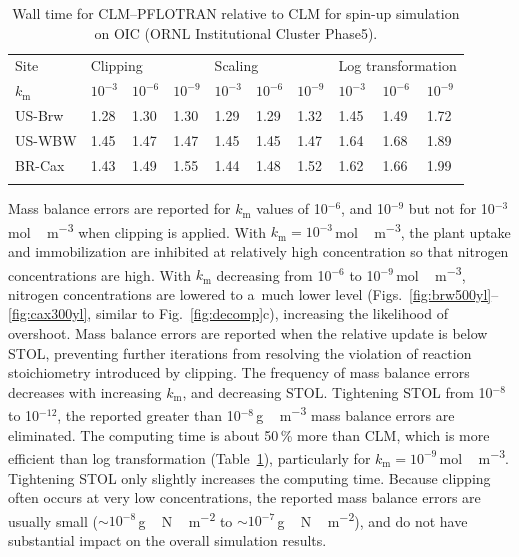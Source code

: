 \documentclass[gmd,noline]{copernicus}
\begin{document}
\begin{table}[t]
\caption{Wall time for CLM--PFLOTRAN relative to CLM for spin-up simulation on
OIC (ORNL Institutional Cluster Phase5).} \label{tab:computingtime}
\begin{tabular}{p{20mm}llp{15mm}llp{15mm}lll}
\tophline
Site &\multicolumn{3}{l}{Clipping}  &\multicolumn{3}{l}{Scaling} &\multicolumn{3}{l}{Log transformation} \\
\middlehline
$k_\mathrm{m}$ &$10^{-3}$ &$10^{-6}$ &$10^{-9}$ &$10^{-3}$ &$10^{-6}$ &$10^{-9}$ &$10^{-3}$ &$10^{-6}$ &$10^{-9}$\\
\cline{1-10}
US-Brw &1.28      &1.30 &1.30 &1.29 &1.29 &1.32 &1.45 &1.49 &1.72 \\
US-WBW   &1.45    &1.47 &1.47 &1.45 &1.45 &1.47 &1.64 &1.68 &1.89 \\
BR-Cax &1.43      &1.49 &1.55 &1.44 &1.48 &1.52 &1.62 &1.66 &1.99 \\
\bottomhline
\end{tabular}
\end{table}

      Mass balance errors are reported for $k_\mathrm{m}$ values of
      10$^{-6}$, and 10$^{-9}$ but not for 10$^{-3}$\,\unit{mol\,m^{-3}}
      when clipping is applied.  With $k_\mathrm{m} =
      10^{-3}$\,\unit{mol\,m^{-3}}, the plant uptake and immobilization are
      inhibited at relatively high concentration so that nitrogen
      concentrations are high. With $k_\mathrm{m}$ decreasing from 10$^{-6}$
      to 10$^{-9}$\,\unit{mol\,m^{-3}}, nitrogen concentrations are lowered
      to a~much lower level (Figs.~\ref{fig:brw500yl}--\ref{fig:cax300yl},
      similar to Fig.~\ref{fig:decomp}c), increasing the likelihood of
      overshoot.  Mass balance errors are reported when the relative update
      is below STOL, preventing further iterations from resolving the
      violation of reaction stoichiometry introduced by clipping. The
      frequency of mass balance errors decreases with increasing
      $k_\mathrm{m}$, and decreasing STOL. Tightening STOL from 10$^{-8}$ to
      10$^{-12}$, the reported greater than 10$^{-8}$\,\unit{g\,m^{-3}} mass
      balance errors are eliminated. The computing time is about 50\,{\%}
      more than CLM, which is more efficient than log transformation
      (Table~\ref{tab:computingtime}), particularly for
      $k_\mathrm{m}=10^{-9}$\,\unit{mol\,m^{-3}}. Tightening STOL only
      slightly increases the computing time. Because clipping often occurs
      at very low concentrations, the reported mass balance errors are
      usually small ($\sim 10 ^{-8}$\,\unit{g\,N\,m^{-2}} to $\sim 10
      ^{-7}$\,\unit{g\,N\,m^{-2}}), and do not have substantial impact on
      the overall simulation results.
\end{document}
